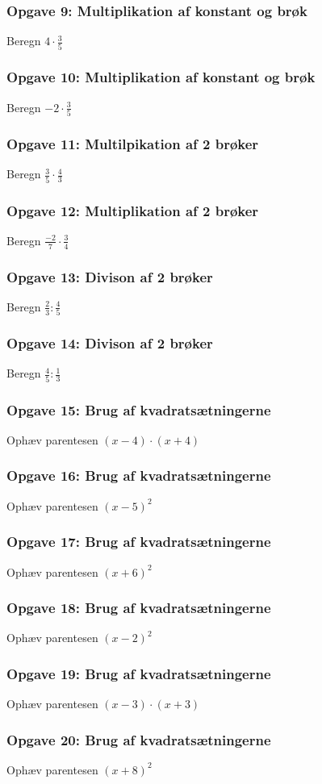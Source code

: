 \subsubsection*{Opgave 9: Multiplikation af konstant og brøk}
Beregn $4 \cdot \frac{3}{5}$

\subsubsection*{Opgave 10: Multiplikation af konstant og brøk}
Beregn $-2 \cdot \frac{3}{5}$

\subsubsection*{Opgave 11: Multilpikation af 2 brøker}
Beregn $\frac{3}{5}\cdot \frac{4}{3}$

\subsubsection*{Opgave 12: Multiplikation af 2 brøker}
Beregn $\frac{-2}{7} \cdot \frac{3}{4}$

\subsubsection*{Opgave 13: Divison af 2 brøker}
Beregn $\frac{2}{3} : \frac{4}{5}$

\subsubsection*{Opgave 14: Divison af 2 brøker}
Beregn $\frac{4}{5} : \frac{1}{3}$

\subsubsection*{Opgave 15: Brug af kvadratsætningerne}
Ophæv parentesen $(x - 4)\cdot (x + 4)$

\subsubsection*{Opgave 16: Brug af kvadratsætningerne}
Ophæv parentesen $(x - 5)^2$

\subsubsection*{Opgave 17: Brug af kvadratsætningerne}
Ophæv parentesen $(x + 6)^2$

\subsubsection*{Opgave 18: Brug af kvadratsætningerne}
Ophæv parentesen $(x - 2)^2$

\subsubsection*{Opgave 19: Brug af kvadratsætningerne}
Ophæv parentesen $(x - 3) \cdot (x + 3)$

\subsubsection*{Opgave 20: Brug af kvadratsætningerne}
Ophæv parentesen $(x + 8)^2$



